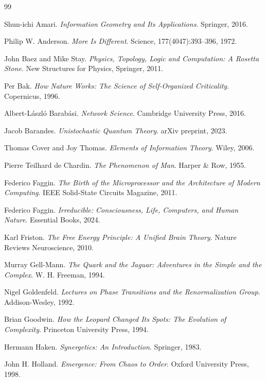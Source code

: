 \documentclass[12pt]{article}
\begin{document}
\newpage
\begin{thebibliography}{99}

Shun-ichi Amari.
\textit{Information Geometry and Its Applications}.
Springer, 2016.

Philip W. Anderson.
\textit{More Is Different}.
Science, 177(4047):393--396, 1972.

John Baez and Mike Stay.
\textit{Physics, Topology, Logic and Computation: A Rosetta Stone}.
New Structures for Physics, Springer, 2011.

Per Bak.
\textit{How Nature Works: The Science of Self-Organized Criticality}.
Copernicus, 1996.

Albert-László Barabási.
\textit{Network Science}.
Cambridge University Press, 2016.

Jacob Barandes.
\textit{Unistochastic Quantum Theory}.
arXiv preprint, 2023.

Thomas Cover and Joy Thomas.
\textit{Elements of Information Theory}.
Wiley, 2006.

Pierre Teilhard de Chardin.
\textit{The Phenomenon of Man}.
Harper \& Row, 1955.

Federico Faggin.
\textit{The Birth of the Microprocessor and the Architecture of Modern Computing}.
IEEE Solid-State Circuits Magazine, 2011.

Federico Faggin.
\textit{Irreducible: Consciousness, Life, Computers, and Human Nature}.
Essential Books, 2024.

Karl Friston.
\textit{The Free Energy Principle: A Unified Brain Theory}.
Nature Reviews Neuroscience, 2010.

Murray Gell-Mann.
\textit{The Quark and the Jaguar: Adventures in the Simple and the Complex}.
W. H. Freeman, 1994.

Nigel Goldenfeld.
\textit{Lectures on Phase Transitions and the Renormalization Group}.
Addison-Wesley, 1992.

Brian Goodwin.
\textit{How the Leopard Changed Its Spots: The Evolution of Complexity}.
Princeton University Press, 1994.

Hermann Haken.
\textit{Synergetics: An Introduction}.
Springer, 1983.

John H. Holland.
\textit{Emergence: From Chaos to Order}.
Oxford University Press, 1998.


\end{thebibliography}
\end{document}
